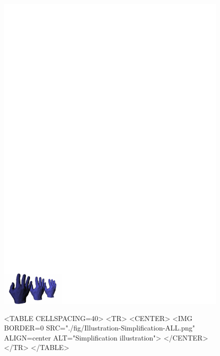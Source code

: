 
\begin{figure}[htbp]
\begin{ccTexOnly}
\begin{center}
\includegraphics[width=17cm]{Surface_mesh_simplification/fig/Illustration-Simplification-ALL} %
\end{center}
\end{ccTexOnly}
\begin{ccHtmlOnly}
<TABLE CELLSPACING=40>
<TR>
<CENTER>
<IMG BORDER=0 SRC="./fig/Illustration-Simplification-ALL.png" ALIGN=center ALT="Simplification illustration">
</CENTER>
</TR>
</TABLE>
\end{ccHtmlOnly}
\end{figure}

